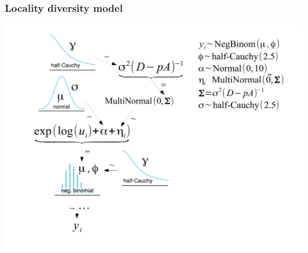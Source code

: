 \documentclass{beamer}
\begin{document}
\begin{frame}
  \frametitle{Locality diversity model}
  \begin{center}
    \includegraphics[height = 0.8\textheight, width = \textwidth,  keepaspectratio = true]{figure/mammal_locality_model}
  \end{center}
\end{frame}
\end{document}

